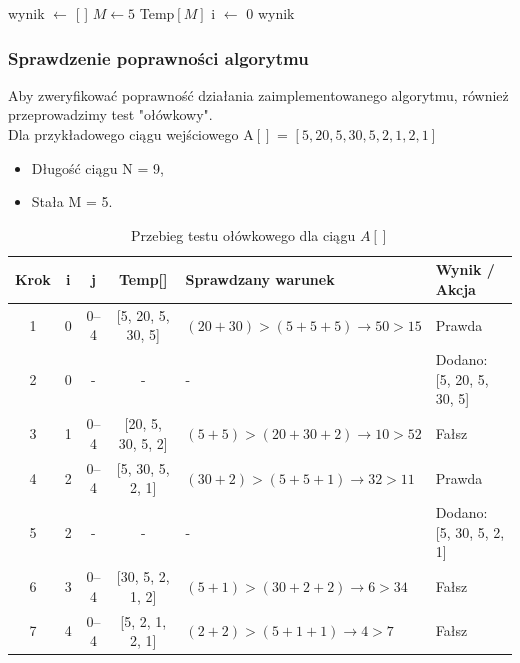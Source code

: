\documentclass[12pt]{article}
\begin{document}
\begin{algorithm}[H]
wynik $\gets$ [ ]\;
\KwConst $M \gets 5$\;
Temp$[M]$\;
i $\gets$ 0\;
\Return wynik\;
\end{algorithm}

\subsubsection{Sprawdzenie poprawności algorytmu}
Aby zweryfikować poprawność działania zaimplementowanego algorytmu, również przeprowadzimy test "ołówkowy".\\
Dla przykładowego ciągu wejściowego A$[]$ = $[5, 20, 5, 30, 5, 2, 1, 2, 1]$
\begin{itemize}
	\item Długość ciągu N = 9,
	\item Stała M = 5.
\end{itemize}
\begin{table}[H]
\centering
\small
\begin{tabular}{c c c c p{5cm} p{5cm}}
\hline
Krok & i & j & Temp[] & Sprawdzany warunek & Wynik / Akcja \\
\hline
1 & 0 & 0--4 & [5, 20, 5, 30, 5] & $(20+30) > (5+5+5) \rightarrow 50 > 15$ & Prawda \\
2 & 0 & - & - & - & Dodano: [5, 20, 5, 30, 5] \\
3 & 1 & 0--4 & [20, 5, 30, 5, 2] & $(5+5) > (20+30+2) \rightarrow 10 > 52$ & Fałsz \\
4 & 2 & 0--4 & [5, 30, 5, 2, 1] & $(30+2) > (5+5+1) \rightarrow 32 > 11$ & Prawda \\
5 & 2 & - & - & - & Dodano: [5, 30, 5, 2, 1] \\
6 & 3 & 0--4 & [30, 5, 2, 1, 2] & $(5+1) > (30+2+2) \rightarrow 6 > 34$ & Fałsz \\
7 & 4 & 0--4 & [5, 2, 1, 2, 1] & $(2+2) > (5+1+1) \rightarrow 4 > 7$ & Fałsz \\
\hline
\end{tabular}
\caption{Przebieg testu ołówkowego dla ciągu $A[]$}
\end{table}
\end{document}
